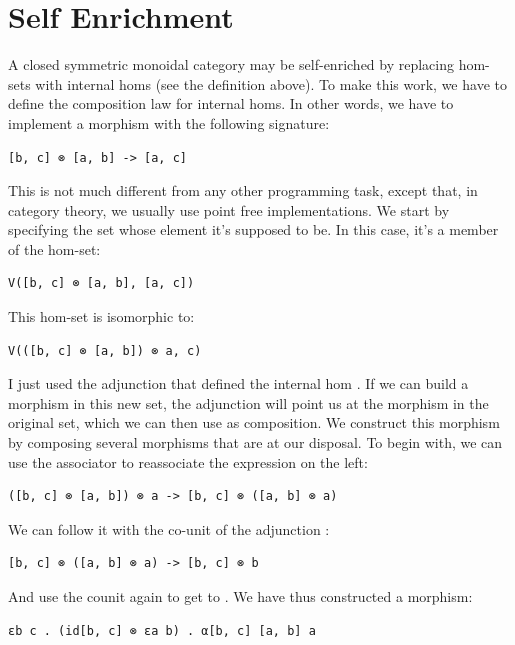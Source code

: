 \section{Self Enrichment}\label{self-enrichment}

A closed symmetric monoidal category may be self-enriched by replacing
hom-sets with internal homs (see the definition above). To make this
work, we have to define the composition law for internal homs. In other
words, we have to implement a morphism with the following signature:

\begin{verbatim}
[b, c] ⊗ [a, b] -> [a, c]
\end{verbatim}

This is not much different from any other programming task, except that,
in category theory, we usually use point free implementations. We start
by specifying the set whose element it's supposed to be. In this case,
it's a member of the hom-set:

\begin{verbatim}
V([b, c] ⊗ [a, b], [a, c])
\end{verbatim}

This hom-set is isomorphic to:

\begin{verbatim}
V(([b, c] ⊗ [a, b]) ⊗ a, c)
\end{verbatim}

I just used the adjunction that defined the internal hom
\code{{[}a,\ c{]}}. If we can build a morphism in this new set, the
adjunction will point us at the morphism in the original set, which we
can then use as composition. We construct this morphism by composing
several morphisms that are at our disposal. To begin with, we can use
the associator  to reassociate the
expression on the left:

\begin{verbatim}
([b, c] ⊗ [a, b]) ⊗ a -> [b, c] ⊗ ([a, b] ⊗ a)
\end{verbatim}

We can follow it with the co-unit of the adjunction :

\begin{verbatim}
[b, c] ⊗ ([a, b] ⊗ a) -> [b, c] ⊗ b
\end{verbatim}

And use the counit  again to get to . We have
thus constructed a morphism:

\begin{verbatim}
εb c . (id[b, c] ⊗ εa b) . α[b, c] [a, b] a
\end{verbatim}

